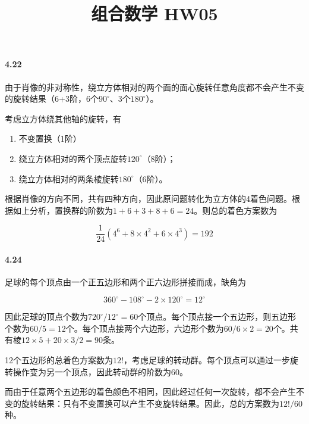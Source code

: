 \documentclass{../notes}
\title{组合数学 HW05}
\begin{document}
    \maketitle

    \paragraph*{4.22}

    由于肖像的非对称性，绕立方体相对的两个面的面心旋转任意角度都不会产生不变的旋转结果（6+3阶，6个$90^\circ$、3个$180^\circ$）。

    考虑立方体绕其他轴的旋转，有

    \begin{enumerate}
        \item 不变置换（1阶）
        \item 绕立方体相对的两个顶点旋转$120^\circ$（8阶）；
        \item 绕立方体相对的两条棱旋转$180^\circ$（6阶）。
    \end{enumerate}

    根据肖像的方向不同，共有四种方向，因此原问题转化为立方体的4着色问题。根据如上分析，置换群的阶数为$1+6+3+8+6=24$。则总的着色方案数为

    \begin{equation}
        \frac{1}{24}\left(4^6 + 8\times 4^2 + 6\times 4^3\right) = 192
    \end{equation}

    \paragraph*{4.24}

    \begin{subquestions}
        \item 足球的每个顶点由一个正五边形和两个正六边形拼接而成，缺角为

        \begin{equation}
        360^\circ - 108^\circ - 2\times 120^\circ = 12^\circ
        \end{equation}

        因此足球的顶点个数为$720^\circ / 12^\circ = 60$个顶点。每个顶点接一个五边形，则五边形个数为$60/5=12$个。每个顶点接两个六边形，六边形个数为$60/6\times 2=20$个。共有棱$12 \times 5 + 20 \times 3 / 2 = 90$条。

        \item 12个五边形的总着色方案数为$12!$，考虑足球的转动群。每个顶点可以通过一步旋转操作变为另一个顶点，因此转动群的阶数为$60$。

        而由于任意两个五边形的着色颜色不相同，因此经过任何一次旋转，都不会产生不变的旋转结果：只有不变置换可以产生不变旋转结果。因此，总的方案数为$12!/60$种。
    \end{subquestions}
\end{document}
